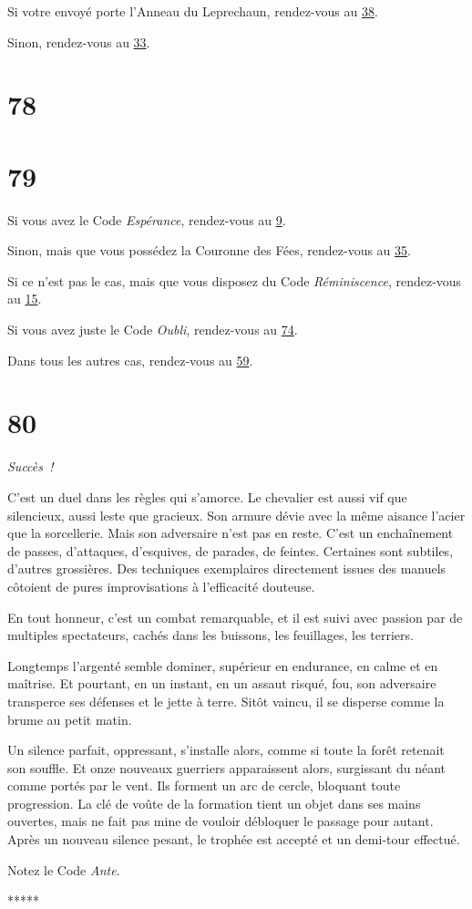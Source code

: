 \documentclass{report}
\newcommand{\gsection}[1]{
    \section{#1}
    \label{section-#1}
}
\newcommand{\glink}[1]{\hyperref[section-#1]{#1}}
\newcommand{\ellipse}{
    \begin{center}
        *****
    \end{center}
}
\newcommand{\success}{
    \emph{Succès !}
}
\begin{document}
Si votre envoyé porte l'Anneau du Leprechaun, rendez-vous au \glink{38}.

Sinon, rendez-vous au \glink{33}.

\gsection{78}

\gsection{79}

Si vous avez le Code \emph{Espérance}, rendez-vous au \glink{9}.

Sinon, mais que vous possédez la Couronne des Fées, rendez-vous au \glink{35}.

Si ce n'est pas le cas, mais que vous disposez du Code \emph{Réminiscence}, rendez-vous au \glink{15}.

Si vous avez juste le Code \emph{Oubli}, rendez-vous au \glink{74}.

Dans tous les autres cas, rendez-vous au \glink{59}.

\gsection{80}

\success

C'est un duel dans les règles qui s'amorce. Le chevalier est aussi vif que silencieux, aussi leste que gracieux. Son armure dévie avec la même aisance l'acier que la sorcellerie. Mais son adversaire n'est pas en reste. C'est un enchaînement de passes, d'attaques, d'esquives, de parades, de feintes. Certaines sont subtiles, d'autres grossières. Des techniques exemplaires directement issues des manuels côtoient de pures improvisations à l'efficacité douteuse.

En tout honneur, c'est un combat remarquable, et il est suivi avec passion par de multiples spectateurs, cachés dans les buissons, les feuillages, les terriers.

Longtemps l'argenté semble dominer, supérieur en endurance, en calme et en maîtrise. Et pourtant, en un instant, en un assaut risqué, fou, son adversaire transperce ses défenses et le jette à terre. Sitôt vaincu, il se disperse comme la brume au petit matin.

Un silence parfait, oppressant, s'installe alors, comme si toute la forêt retenait son souffle. Et onze nouveaux guerriers apparaissent alors, surgissant du néant comme portés par le vent. Ils forment un arc de cercle, bloquant toute progression. La clé de voûte de la formation tient un objet dans ses mains ouvertes, mais ne fait pas mine de vouloir débloquer le passage pour autant. Après un nouveau silence pesant, le trophée est accepté et un demi-tour effectué.

Notez le Code \emph{Ante}.

\ellipse
\end{document}
